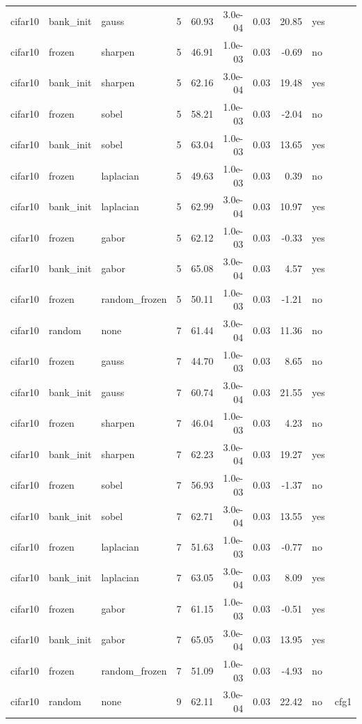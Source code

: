 \begin{table}[htbp]
{\begin{tabular}{@{}lllrrrrrll@{}}
cifar10 & bank\_init & gauss & 5 & 60.93 & 3.0e-04 & 0.03 & 20.85 & yes &  \\
cifar10 & frozen & sharpen & 5 & 46.91 & 1.0e-03 & 0.03 & -0.69 & no &  \\
cifar10 & bank\_init & sharpen & 5 & 62.16 & 3.0e-04 & 0.03 & 19.48 & yes &  \\
cifar10 & frozen & sobel & 5 & 58.21 & 1.0e-03 & 0.03 & -2.04 & no &  \\
cifar10 & bank\_init & sobel & 5 & 63.04 & 1.0e-03 & 0.03 & 13.65 & yes &  \\
cifar10 & frozen & laplacian & 5 & 49.63 & 1.0e-03 & 0.03 & 0.39 & no &  \\
cifar10 & bank\_init & laplacian & 5 & 62.99 & 3.0e-04 & 0.03 & 10.97 & yes &  \\
cifar10 & frozen & gabor & 5 & 62.12 & 1.0e-03 & 0.03 & -0.33 & yes &  \\
cifar10 & bank\_init & gabor & 5 & 65.08 & 3.0e-04 & 0.03 & 4.57 & yes &  \\
cifar10 & frozen & random\_frozen & 5 & 50.11 & 1.0e-03 & 0.03 & -1.21 & no &  \\
cifar10 & random & none & 7 & 61.44 & 3.0e-04 & 0.03 & 11.36 & no &  \\
cifar10 & frozen & gauss & 7 & 44.70 & 1.0e-03 & 0.03 & 8.65 & no &  \\
cifar10 & bank\_init & gauss & 7 & 60.74 & 3.0e-04 & 0.03 & 21.55 & yes &  \\
cifar10 & frozen & sharpen & 7 & 46.04 & 1.0e-03 & 0.03 & 4.23 & no &  \\
cifar10 & bank\_init & sharpen & 7 & 62.23 & 3.0e-04 & 0.03 & 19.27 & yes &  \\
cifar10 & frozen & sobel & 7 & 56.93 & 1.0e-03 & 0.03 & -1.37 & no &  \\
cifar10 & bank\_init & sobel & 7 & 62.71 & 3.0e-04 & 0.03 & 13.55 & yes &  \\
cifar10 & frozen & laplacian & 7 & 51.63 & 1.0e-03 & 0.03 & -0.77 & no &  \\
cifar10 & bank\_init & laplacian & 7 & 63.05 & 3.0e-04 & 0.03 & 8.09 & yes &  \\
cifar10 & frozen & gabor & 7 & 61.15 & 1.0e-03 & 0.03 & -0.51 & yes &  \\
cifar10 & bank\_init & gabor & 7 & 65.05 & 3.0e-04 & 0.03 & 13.95 & yes &  \\
cifar10 & frozen & random\_frozen & 7 & 51.09 & 1.0e-03 & 0.03 & -4.93 & no &  \\
cifar10 & random & none & 9 & 62.11 & 3.0e-04 & 0.03 & 22.42 & no & cfg1 \\

\end{tabular}}
\end{table}
